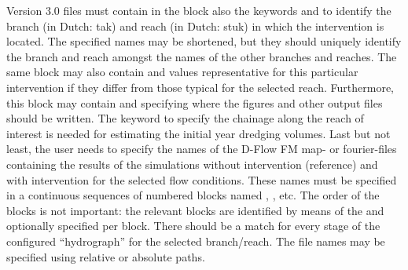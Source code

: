 Version 3.0 files must contain in the \keyw{[General]} block also the keywords  and  to identify the branch (in Dutch: tak) and reach (in Dutch: stuk) in which the intervention is located.
The specified names may be shortened, but they should uniquely identify the branch and reach amongst the names of the other branches and reaches.
The same block may also contain  and  values representative for this particular intervention if they differ from those typical for the selected reach.
Furthermore, this block may contain  and  specifying where the figures and other output files should be written.
The  keyword to specify the chainage along the reach of interest is needed for estimating the initial year dredging volumes.
Last but not least, the user needs to specify the names of the D-Flow FM map- or fourier-files containing the results of the simulations without intervention (reference) and with intervention for the selected flow conditions.
These names must be specified in a continuous sequences of numbered blocks named , , etc.
The order of the blocks is not important: the relevant blocks are identified by means of the  and optionally  specified per block.
There should be a match for every stage of the configured ``hydrograph'' for the selected branch/reach.
The file names may be specified using relative or absolute paths.

